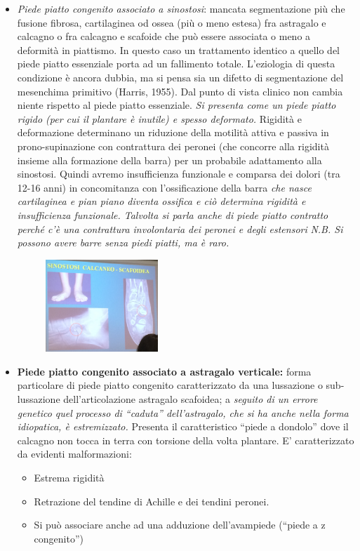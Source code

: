 \begin{itemize}
\item
  \emph{Piede piatto congenito associato a sinostosi}: mancata segmentazione più che fusione fibrosa, cartilaginea od ossea (più o meno estesa) fra astragalo e calcagno o fra calcagno e scafoide che può essere associata o meno a deformità in piattismo. In questo caso un trattamento identico a quello del piede piatto essenziale porta ad un fallimento totale. L'eziologia di questa condizione è ancora dubbia, ma si pensa sia un difetto di segmentazione del mesenchima primitivo (Harris, 1955). Dal punto di vista clinico non cambia niente rispetto al piede piatto essenziale. \emph{Si presenta come un piede piatto rigido (per cui il plantare è inutile) \emph{e spesso deformato}.} Rigidità e deformazione determinano un riduzione della motilità attiva e passiva in prono-supinazione con contrattura dei peronei (che concorre alla rigidità insieme alla formazione della barra) per un probabile adattamento alla sinostosi. Quindi avremo insufficienza funzionale e comparsa dei dolori (tra 12-16 anni) in concomitanza con l'ossificazione della barra \emph{che nasce cartilaginea e pian piano diventa ossifica e ciò determina rigidità e insufficienza funzionale. Talvolta si parla anche di piede piatto contratto perché c'è una contrattura involontaria dei peronei e degli estensori}
\emph{N.B. Si possono avere barre senza piedi piatti, ma è raro.}

\begin{figure}[!ht]
\centering
\includegraphics[width=0.4\textwidth]{014/image9.jpeg}
\end{figure}

\item
  \textbf{Piede piatto congenito associato a astragalo verticale:} forma particolare di piede piatto congenito caratterizzato da una lussazione o sub-lussazione dell'articolazione astragalo scafoidea; a \emph{seguito di un errore genetico quel processo di ``caduta'' dell'astragalo, che si ha anche nella forma idiopatica, è estremizzato.} Presenta il caratteristico ``piede a dondolo'' dove il calcagno non tocca in terra con torsione della volta plantare. E' caratterizzato da evidenti malformazioni:
\begin{itemize}
\item
  Estrema rigidità
\item
  Retrazione del tendine di Achille e dei tendini peronei.
\item
  Si può associare anche ad una adduzione dell'avampiede (``piede a z congenito'')
\end{itemize}
\end{itemize}

